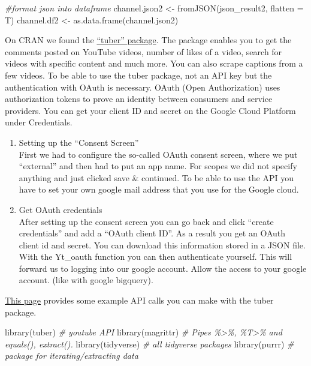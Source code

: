 \documentclass[
]{book}
\newenvironment{Shaded}{\begin{snugshade}}{\end{snugshade}}
\newcommand{\AttributeTok}[1]{\textcolor[rgb]{0.77,0.63,0.00}{#1}}
\newcommand{\CommentTok}[1]{\textcolor[rgb]{0.56,0.35,0.01}{\textit{#1}}}
\newcommand{\FunctionTok}[1]{\textcolor[rgb]{0.00,0.00,0.00}{#1}}
\newcommand{\NormalTok}[1]{#1}
\newcommand{\OtherTok}[1]{\textcolor[rgb]{0.56,0.35,0.01}{#1}}
\begin{document}
\begin{Shaded}
\begin{Highlighting}[]
\CommentTok{\#format json into dataframe}
\NormalTok{channel.json2 }\OtherTok{\textless{}{-}} \FunctionTok{fromJSON}\NormalTok{(json\_result2, }\AttributeTok{flatten =}\NormalTok{ T)}
\NormalTok{channel.df2 }\OtherTok{\textless{}{-}} \FunctionTok{as.data.frame}\NormalTok{(channel.json2)}
\end{Highlighting}
\end{Shaded}

On CRAN we found the \href{https://cran.r-project.org/web/packages/tuber/index.html}{``tuber'' package}. The package enables you to get the comments posted on YouTube videos, number of likes of a video, search for videos with specific content and much more. You can also scrape captions from a few videos. To be able to use the tuber package, not an API key but the authentication with OAuth is necessary. OAuth (Open Authorization) uses authorization tokens to prove an identity between consumers and service providers. You can get your client ID and secret on the Google Cloud Platform under Credentials.

\begin{enumerate}
\def\labelenumi{\arabic{enumi})}
\item
  Setting up the ``Consent Screen''\\
  First we had to configure the so-called OAuth consent screen, where we put ``external'' and then had to put an app name. For scopes we did not specify anything and just clicked save \& continued. To be able to use the API you have to set your own google mail address that you use for the Google cloud.
\item
  Get OAuth credentials\\
  After setting up the consent screen you can go back and click ``create credentials'' and add a ``OAuth client ID''. As a result you get an OAuth client id and secret. You can download this information stored in a JSON file. With the Yt\_oauth function you can then authenticate yourself. This will forward us to logging into our google account. Allow the access to your google account. (like with google bigquery).
\end{enumerate}

\href{https://www.storybench.org/how-to-download-youtube-data-in-r-using-tuber-and-purrr/}{This page} provides some example API calls you can make with the tuber package.

\begin{Shaded}
\begin{Highlighting}[]
\FunctionTok{library}\NormalTok{(tuber) }\CommentTok{\# youtube API}
\FunctionTok{library}\NormalTok{(magrittr) }\CommentTok{\# Pipes \%\textgreater{}\%, \%T\textgreater{}\% and equals(), extract().}
\FunctionTok{library}\NormalTok{(tidyverse) }\CommentTok{\# all tidyverse packages}
\FunctionTok{library}\NormalTok{(purrr) }\CommentTok{\# package for iterating/extracting data}
\end{Highlighting}
\end{Shaded}
\end{document}

